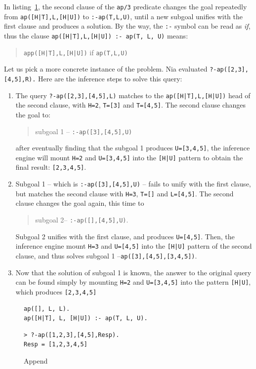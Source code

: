 \documentclass[a4paper,12pt]{book}
\newenvironment{fmpage}[1]
           {\begin{lrbox}{\fmbox}\begin{minipage}{#1}}
           {\end{minipage}\end{lrbox}\fbox{\usebox{\fmbox}}}
\begin{document}
In listing~\ref{rec/app}, the second clause of the \verb|ap/3|
predicate changes the goal repeatedly from
\verb/ap([H|T],L,[H|U])/ to \verb/:-ap(T,L,U)/, until a new
subgoal unifies with the first clause and produces a solution.
By the way, the \verb|:-| symbol can be read as {\em if},
thus the clause \verb/ap([H|T],L,[H|U]) :- ap(T, L, U)/ means:
\begin{quote}
\verb/app([H|T],L,[H|U])/ if \verb/ap(T,L,U)/
\end{quote}

Let us pick a more concrete instance of the problem.
Nia evaluated \verb|?-ap([2,3], [4,5],R).| Here are the
inference steps to solve this query:
\begin{enumerate}
\item The query \verb/?-ap([2,3],[4,5],L)/ matches
to the \verb/ap([H|T],L,[H|U])/ head of the second clause,
with \verb|H=2|, \verb|T=[3]| and \verb|T=[4,5]|.
The second clause changes the goal to:
\begin{quote}
	subgoal 1 -- \verb/:-ap([3],[4,5],U)/
\end{quote}
after eventually finding that the subgoal 1 produces
\verb|U=[3,4,5]|, the inference engine will mount
\verb/H=2/ and \verb/U=[3,4,5]/ into the \verb/[H|U]/
pattern to obtain the final result: \verb/[2,3,4,5]/.
\item Subgoal 1 -- which is \verb/:-ap([3],[4,5],U)/
      -- fails to unify with the first clause, but
      matches the second clause with \verb|H=3|,
      \verb|T=[]| and \verb|L=[4,5]|. The second clause
      changes the goal again, this time to
\begin{quote}
      subgoal 2-- \verb|:-ap([],[4,5],U)|.
\end{quote}
Subgoal 2 unifies with the first clause,
and produces \verb/U=[4,5]/. Then, the inference
engine mount \verb|H=3| and \verb|U=[4,5]| into
the \verb/[H|U]/ pattern of the second clause,
and thus solves subgoal 1 --\verb/ap([3],[4,5],[3,4,5])/.
\item Now that the solution of subgoal 1 is known,
the answer to the original query can be found simply
by mounting \verb/H=2/ and \verb/U=[3,4,5]/ into
the pattern \verb/[H|U]/, which produces \verb/[2,3,4,5]/
\end{enumerate}

\begin{figure}[!h]
\begin{fmpage}{0.8\linewidth}
\begin{verbatim}
ap([], L, L).
ap([H|T], L, [H|U]) :- ap(T, L, U).
\end{verbatim}
\end{fmpage}

\begin{fmpage}{0.8\linewidth}
\begin{verbatim}
> ?-ap([1,2,3],[4,5],Resp).
Resp = [1,2,3,4,5]
\end{verbatim}
\end{fmpage}
\caption{Append}
\label{rec/app}
\end{figure}
\end{document}
